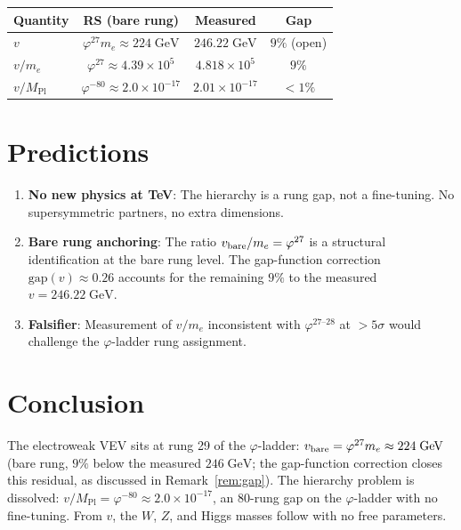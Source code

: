 \documentclass[12pt,a4paper]{article}
\theoremstyle{definition}
\theoremstyle{remark}
\begin{document}
\begin{center}
\renewcommand{\arraystretch}{1.3}
\begin{tabular}{lccc}
\toprule
\textbf{Quantity} & \textbf{RS (bare rung)} &
\textbf{Measured} & \textbf{Gap} \\
\midrule
$v$ & $\varphi^{27}m_e \approx 224\;\mathrm{GeV}$ &
  $246.22\;\mathrm{GeV}$ & $9\%$ (open) \\
$v/m_e$ & $\varphi^{27} \approx 4.39 \times 10^5$ &
  $4.818 \times 10^5$ & $9\%$ \\
$v/M_{\mathrm{Pl}}$ & $\varphi^{-80} \approx 2.0 \times 10^{-17}$ &
  $2.01 \times 10^{-17}$ & $<1\%$ \\
\bottomrule
\end{tabular}
\end{center}

\section{Predictions}
\label{sec:predictions}

\begin{enumerate}
  \item \textbf{No new physics at TeV}: The hierarchy is a rung
  gap, not a fine-tuning.  No supersymmetric partners, no extra
  dimensions.

  \item \textbf{Bare rung anchoring}: The ratio
  $v_{\rm bare}/m_e = \varphi^{27}$ is a structural identification
  at the bare rung level.  The gap-function correction
  $\mathrm{gap}(v) \approx 0.26$ accounts for the remaining $9\%$
  to the measured $v = 246.22\;\mathrm{GeV}$.

  \item \textbf{Falsifier}: Measurement of $v/m_e$ inconsistent
  with $\varphi^{27\text{--}28}$ at $> 5\sigma$ would challenge the
  $\varphi$-ladder rung assignment.
\end{enumerate}

\section{Conclusion}
\label{sec:conclusion}

The electroweak VEV sits at rung 29 of the $\varphi$-ladder:
$v_{\rm bare} = \varphi^{27} m_e \approx 224\;\mathrm{GeV}$ (bare rung,
$9\%$ below the measured $246\;\mathrm{GeV}$; the gap-function
correction closes this residual, as discussed in
Remark~\ref{rem:gap}).  The hierarchy problem is dissolved:
$v/M_{\mathrm{Pl}} = \varphi^{-80} \approx 2.0 \times 10^{-17}$,
an 80-rung gap on the $\varphi$-ladder with no fine-tuning.
From $v$, the $W$, $Z$, and Higgs masses follow with no free
parameters.
\end{document}
